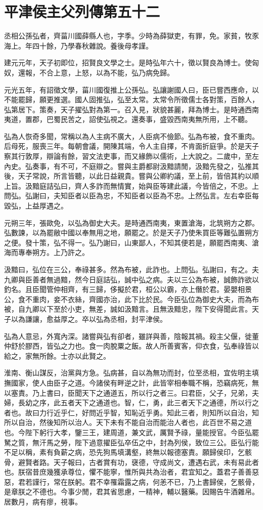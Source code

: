 \chapter{平津侯主父列傳第五十二}

丞相公孫弘者，齊菑川國薛縣人也，字季。少時為薛獄吏，有罪，免。家貧，牧豕海上。年四十餘，乃學春秋雜說。養後母孝謹。

建元元年，天子初即位，招賢良文學之士。是時弘年六十，徵以賢良為博士。使匈奴，還報，不合上意，上怒，以為不能，弘乃病免歸。

元光五年，有詔徵文學，菑川國復推上公孫弘。弘讓謝國人曰，臣已嘗西應命，以不能罷歸，願更推選。國人固推弘，弘至太常。太常令所徵儒士各對策，百餘人，弘第居下。策奏，天子擢弘對為第一。召入見，狀貌甚麗，拜為博士。是時通西南夷道，置郡，巴蜀民苦之，詔使弘視之。還奏事，盛毀西南夷無所用，上不聽。

弘為人恢奇多聞，常稱以為人主病不廣大，人臣病不儉節。弘為布被，食不重肉。后母死，服喪三年。每朝會議，開陳其端，令人主自擇，不肯面折庭爭。於是天子察其行敦厚，辯論有餘，習文法吏事，而又緣飾以儒術，上大說之。二歲中，至左內史。弘奏事，有不可，不庭辯之。嘗與主爵都尉汲黯請閒，汲黯先發之，弘推其後，天子常說，所言皆聽，以此日益親貴。嘗與公卿約議，至上前，皆倍其約以順上旨。汲黯庭詰弘曰，齊人多詐而無情實，始與臣等建此議，今皆倍之，不忠。上問弘。弘謝曰，夫知臣者以臣為忠，不知臣者以臣為不忠。上然弘言。左右幸臣每毀弘，上益厚遇之。

元朔三年，張歐免，以弘為御史大夫。是時通西南夷，東置滄海，北筑朔方之郡。弘數諫，以為罷敝中國以奉無用之地，願罷之。於是天子乃使朱買臣等難弘置朔方之便。發十策，弘不得一。弘乃謝曰，山東鄙人，不知其便若是，願罷西南夷、滄海而專奉朔方。上乃許之。

汲黯曰，弘位在三公，奉祿甚多。然為布被，此詐也。上問弘。弘謝曰，有之。夫九卿與臣善者無過黯，然今日庭詰弘，誠中弘之病。夫以三公為布被，誠飾詐欲以釣名。且臣聞管仲相齊，有三歸，侈擬於君，桓公以霸，亦上僭於君。晏嬰相景公，食不重肉，妾不衣絲，齊國亦治，此下比於民。今臣弘位為御史大夫，而為布被，自九卿以下至於小吏，無差，誠如汲黯言。且無汲黯忠，陛下安得聞此言。天子以為謙讓，愈益厚之。卒以弘為丞相，封平津侯。

弘為人意忌，外寬內深。諸嘗與弘有卻者，雖詳與善，陰報其禍。殺主父偃，徙董仲舒於膠西，皆弘之力也。食一肉脫粟之飯。故人所善賓客，仰衣食，弘奉祿皆以給之，家無所餘。士亦以此賢之。

淮南、衡山謀反，治黨與方急。弘病甚，自以為無功而封，位至丞相，宜佐明主填撫國家，使人由臣子之道。今諸侯有畔逆之計，此皆宰相奉職不稱，恐竊病死，無以塞責。乃上書曰，臣聞天下之通道五，所以行之者三。曰君臣，父子，兄弟，夫婦，長幼之序，此五者天下之通道也。智，仁，勇，此三者天下之通德，所以行之者也。故曰力行近乎仁，好問近乎智，知恥近乎勇。知此三者，則知所以自治，知所以自治，然後知所以治人。天下未有不能自治而能治人者也，此百世不易之道也。今陛下躬行大孝，鑒三王，建周道，兼文武，厲賢予祿，量能授官。今臣弘罷駑之質，無汗馬之勞，陛下過意擢臣弘卒伍之中，封為列侯，致位三公。臣弘行能不足以稱，素有負薪之病，恐先狗馬填溝壑，終無以報德塞責。願歸侯印，乞骸骨，避賢者路。天子報曰，古者賞有功，襃德，守成尚文，遭遇右武，未有易此者也。朕宿昔庶幾獲承尊位，懼不能寧，惟所與共為治者，君宜知之。蓋君子善善惡惡，君若謹行，常在朕躬。君不幸罹霜露之病，何恙不已，乃上書歸侯，乞骸骨，是章朕之不德也。今事少閒，君其省思慮，一精神，輔以醫藥。因賜告牛酒雜帛。居數月，病有瘳，視事。

